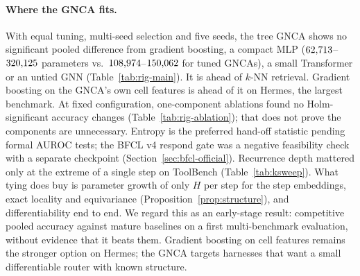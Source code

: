 \documentclass[10pt,twocolumn,letterpaper]{article}
\begin{document}
\paragraph{Where the GNCA fits.} With equal tuning, multi-seed selection and five seeds, the tree GNCA shows no significant pooled difference from gradient boosting, a compact MLP ($62{,}713$--$320{,}125$ parameters vs.\ $108{,}974$--$150{,}062$ for tuned GNCAs), a small Transformer or an untied GNN (Table~\ref{tab:rig-main}). It is ahead of $k$-NN retrieval. Gradient boosting on the GNCA's own cell features is ahead of it on Hermes, the largest benchmark. At fixed configuration, one-component ablations found no Holm-significant accuracy changes (Table~\ref{tab:rig-ablation}); that does not prove the components are unnecessary. Entropy is the preferred hand-off statistic pending formal AUROC tests; the BFCL v4 respond gate was a negative feasibility check with a separate checkpoint (Section~\ref{sec:bfcl-official}). Recurrence depth mattered only at the extreme of a single step on ToolBench (Table~\ref{tab:ksweep}). What tying does buy is parameter growth of only $H$ per step for the step embeddings, exact locality and equivariance (Proposition~\ref{prop:structure}), and differentiability end to end. We regard this as an early-stage result: competitive pooled accuracy against mature baselines on a first multi-benchmark evaluation, without evidence that it beats them. Gradient boosting on cell features remains the stronger option on Hermes; the GNCA targets harnesses that want a small differentiable router with known structure.
\end{document}
